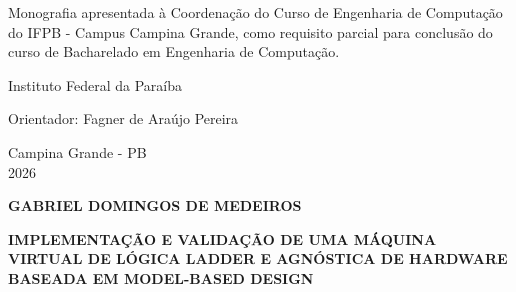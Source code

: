 \documentclass[portuguese,12pt,oneside,a4paper]{book}
\begin{document}
    \begin{flushright}
		\begin{minipage}[left]{0.5\linewidth}

			Monografia apresentada à Coordenação do Curso de Engenharia de Computação do IFPB - Campus Campina Grande, como requisito parcial para conclusão do curso de Bacharelado em Engenharia de Computação.\\

		\end{minipage}

   	\end{flushright}


\begin{center}

    \vskip 1cm
    Instituto Federal da Paraíba

    \vskip 2cm
    Orientador: Fagner de Araújo Pereira\\

    \vfill

    Campina Grande - PB\\
    2026
\end{center}

\newpage





\newpage
\thispagestyle{empty}
    \begin{center}


	    \textbf{GABRIEL DOMINGOS DE MEDEIROS}

        \vspace*{2cm}

    	\textbf{IMPLEMENTAÇÃO E VALIDAÇÃO DE UMA MÁQUINA VIRTUAL DE LÓGICA LADDER E AGNÓSTICA DE HARDWARE BASEADA EM MODEL-BASED DESIGN}\\

    	\vskip 2cm
    \end{center}
\end{document}
